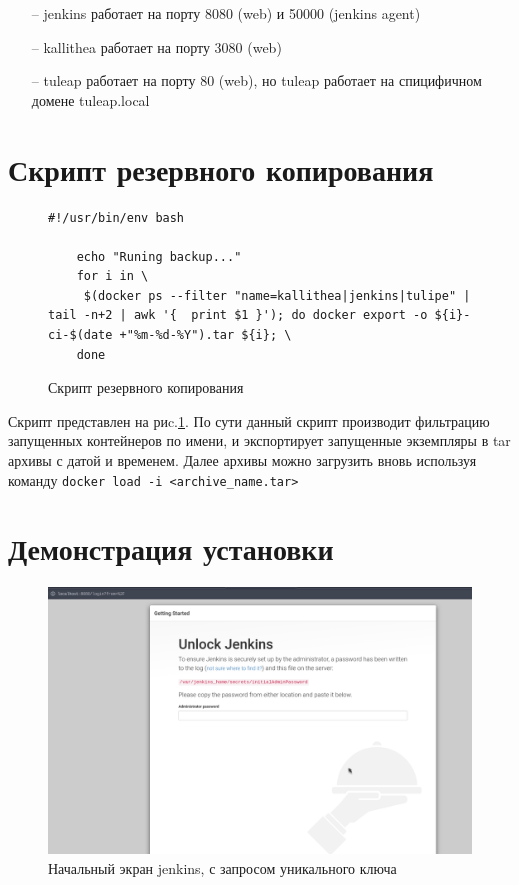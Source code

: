 \documentclass[a4paper]{extarticle}
\begin{document}
\begin{itemize}
\item[--] jenkins работает на порту 8080 (web) и 50000 (jenkins agent)
\item[--] kallithea работает на порту 3080 (web)
\item[--] tuleap работает на порту 80 (web), но tuleap работает на спицифичном домене tuleap.local
\end{itemize}

\section{Скрипт резервного копирования}

\begin{figure}[H]
\begin{verbatim}
#!/usr/bin/env bash

	echo "Runing backup..."
	for i in \
	 $(docker ps --filter "name=kallithea|jenkins|tulipe" | tail -n+2 | awk '{  print $1 }'); do docker export -o ${i}-ci-$(date +"%m-%d-%Y").tar ${i}; \
	done

\end{verbatim}
\caption{Скрипт резервного копирования}
\label{fig:backup}
\end{figure}

Скрипт представлен на риc.\ref{fig:backup}. По сути данный  скрипт производит фильтрацию запущенных контейнеров по имени, и экспортирует запущенные экземпляры в tar архивы с датой и временем. Далее архивы можно загрузить вновь используя команду 
\texttt{docker load -i <archive\_name.tar>}

\section{Демонстрация установки}

\begin{figure}[H]
\includegraphics[width=\textwidth,height=\textheight,keepaspectratio]{jenkins_setup.png}
\caption{Начальный экран jenkins, с запросом уникального ключа}
\end{figure}
\end{document}
